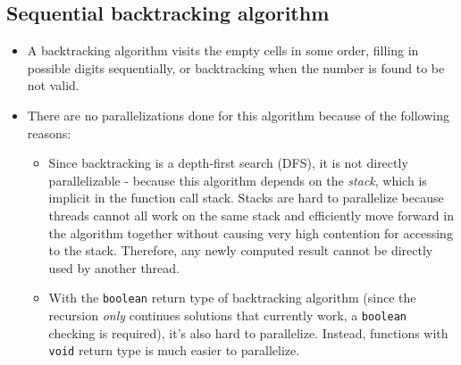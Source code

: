 \documentclass[12pt,a4paper]{article}
\newcommand{\code}[1]{\colorbox{light-gray}{\texttt{#1}}}
\begin{document}
	\subsection{Sequential backtracking algorithm}
		\begin{itemize}
			\item A backtracking algorithm visits the empty cells in some order, filling in possible digits sequentially, or backtracking when the number is found to be not valid. \cite{wiki:Sudoku-solving-algorithms}
			\item There are no parallelizations done for this algorithm because of the following reasons:
				\begin{itemize}
					\item Since backtracking is a depth-first search (DFS), it is not directly parallelizable - because this algorithm depends on the \textit{stack},
					which is implicit in the function call stack. Stacks are hard to parallelize because threads cannot all work on the same stack and efficiently move forward in the algorithm together
					without causing very high contention for accessing to the stack. Therefore, any newly computed result cannot be directly used by another thread.
					\item With the \code{boolean} return type of backtracking algorithm (since the recursion \textit{only} continues solutions that currently work,
					a \code{boolean} checking is required), it's also hard to parallelize. Instead, functions with \code{void} return type is much easier to parallelize.
				\end{itemize}
		\end{itemize}
\end{document}
